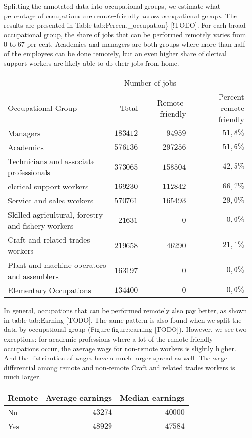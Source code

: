 \documentclass[11pt,]{article}
\begin{document}
Splitting the annotated data into occupational groups, we estimate what
percentage of occupations are remote-friendly across occupational
groups. The results are presented in Table tab:Percent\_occupation\}
{[}!TODO{]}. For each broad occupational group, the share of jobs that
can be performed remotely varies from 0 to 67 per cent. Academics and
managers are both groups where more than half of the employees can be
done remotely, but an even higher share of clerical support workers are
likely able to do their jobs from home.

\captionsetup[table]{labelformat=empty,skip=1pt}
\begin{longtable}{lrrr}
\toprule
& \multicolumn{2}{c}{Number of jobs} & \\ 
 \cmidrule(lr){2-3}
Occupational Group & Total & Remote-friendly & Percent remote friendly \\ 
\midrule
Managers & $183 412$ & $94 959$ & $51,8\%$ \\ 
Academics & $576 136$ & $297 256$ & $51,6\%$ \\ 
Technicians and associate professionals & $373 065$ & $158 504$ & $42,5\%$ \\ 
clerical support workers & $169 230$ & $112 842$ & $66,7\%$ \\ 
Service and sales workers & $570 761$ & $165 493$ & $29,0\%$ \\ 
Skilled agricultural, forestry and fishery workers & $21 631$ & $0$ & $0,0\%$ \\ 
Craft and related trades workers & $219 658$ & $46 290$ & $21,1\%$ \\ 
Plant and machine operators and assemblers & $163 197$ & $0$ & $0,0\%$ \\ 
Elementary Occupations & $134 400$ & $0$ & $0,0\%$ \\ 
\bottomrule
\end{longtable}

In general, occupations that can be performed remotely also pay better,
as shown in table tab:Earning {[}TODO{]}. The same pattern is also found
when we split the data by occupational group (Figure figure:earning
{[}TODO{]}). However, we see two exceptions: for academic professions
where a lot of the remote-friendly occupations occur, the average wage
for non-remote workers is slightly higher. And the distribution of wages
have a much larger spread as well. The wage differential among remote
and non-remote Craft and related trades workers is much larger.

\captionsetup[table]{labelformat=empty,skip=1pt}
\begin{longtable}{lrr}
\toprule
Remote & Average earnings & Median earnings \\ 
\midrule
No & $43 274$ & $40 000$ \\ 
Yes & $48 929$ & $47 584$ \\ 
\bottomrule
\end{longtable}
\end{document}
